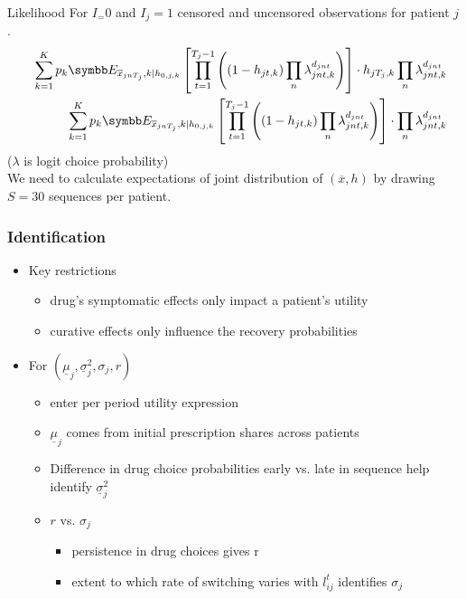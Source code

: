 \documentclass[aspectratio=169,11pt]{beamer}
\begin{document}
\begin{frame}{Likelihood}
For $I_=0$ and $I_j=1$ censored and uncensored observations for patient $j$.
\begin{eqnarray*}
&&\sum_{k=1}^K p_k \E_{\overline{x}_{jn T_{j}},k \mid h_{0,j,k}} \left[ \prod_{t=1}^{T_j-1} \left((1-h_{jt,k}) \prod_n \lambda_{jnt,k}^{d_{jnt}} \right) \right] \cdot h_{jT_j,k} \prod_n  \lambda_{jnt,k}^{d_{jnt}}\\
&&\sum_{k=1}^K p_k \E_{\overline{x}_{jn T_{j}},k \mid h_{0,j,k}} \left[ \prod_{t=1}^{T_j-1} \left((1-h_{jt,k}) \prod_n \lambda_{jnt,k}^{d_{jnt}} \right) \right] \cdot \prod_n  \lambda_{jnt,k}^{d_{jnt}}\\
\end{eqnarray*}
($\lambda$ is logit choice probability)\\
We need to calculate expectations of joint distribution of $(\overline{x},h)$ by drawing $S=30$ sequences  per patient.
\end{frame}


\begin{frame}
\frametitle{Identification}

\begin{itemize}
\item Key restrictions

\begin{itemize}
\item drug's symptomatic effects only impact a patient's utility

\item curative effects only influence the recovery probabilities
\end{itemize}

\item For $(\underline{\mu }_{j},\underline{\sigma }_{j}^{2},\sigma _{j},r)$

\begin{itemize}
\item enter per period utility expression

\item $\underline{\mu }_{j}$ comes from initial prescription shares across
patients

\item Difference in drug choice probabilities early vs. late in sequence
help identify $\underline{\sigma }_{j}^{2}$

\item $r$ vs. $\sigma _{j}$

\begin{itemize}
\item persistence in drug choices gives r

\item extent to which rate of switching varies with $l_{ij}^{t}$ identifies $%
\sigma _{j}$
\end{itemize}
\end{itemize}
\end{itemize}
\end{frame}
\end{document}
